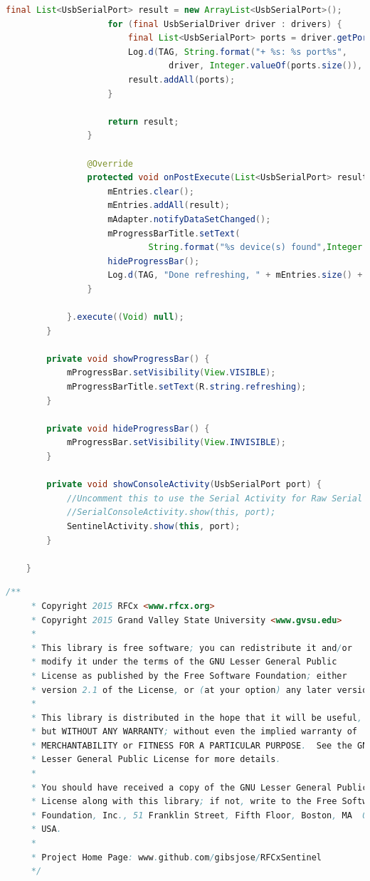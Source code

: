\documentclass{article}
\numberwithin{figure}{section}
\numberwithin{equation}{section}
\begin{document}
{\begin{lstlisting}[language=Java,label=lst:devicelist,caption=DeviceListActivity.java]
                    final List<UsbSerialPort> result = new ArrayList<UsbSerialPort>();
                    for (final UsbSerialDriver driver : drivers) {
                        final List<UsbSerialPort> ports = driver.getPorts();
                        Log.d(TAG, String.format("+ %s: %s port%s",
                                driver, Integer.valueOf(ports.size()), ports.size() == 1 ? "" : "s"));
                        result.addAll(ports);
                    }

                    return result;
                }

                @Override
                protected void onPostExecute(List<UsbSerialPort> result) {
                    mEntries.clear();
                    mEntries.addAll(result);
                    mAdapter.notifyDataSetChanged();
                    mProgressBarTitle.setText(
                            String.format("%s device(s) found",Integer.valueOf(mEntries.size())));
                    hideProgressBar();
                    Log.d(TAG, "Done refreshing, " + mEntries.size() + " entries found.");
                }

            }.execute((Void) null);
        }

        private void showProgressBar() {
            mProgressBar.setVisibility(View.VISIBLE);
            mProgressBarTitle.setText(R.string.refreshing);
        }

        private void hideProgressBar() {
            mProgressBar.setVisibility(View.INVISIBLE);
        }

        private void showConsoleActivity(UsbSerialPort port) {
            //Uncomment this to use the Serial Activity for Raw Serial Data
            //SerialConsoleActivity.show(this, port);
            SentinelActivity.show(this, port);
        }

    }
\end{lstlisting}

\begin{lstlisting}[language=Java,label=lst:sentlist,caption=SentinelActivity.java]
    /**
     * Copyright 2015 RFCx <www.rfcx.org>
     * Copyright 2015 Grand Valley State University <www.gvsu.edu>
     *
     * This library is free software; you can redistribute it and/or
     * modify it under the terms of the GNU Lesser General Public
     * License as published by the Free Software Foundation; either
     * version 2.1 of the License, or (at your option) any later version.
     *
     * This library is distributed in the hope that it will be useful,
     * but WITHOUT ANY WARRANTY; without even the implied warranty of
     * MERCHANTABILITY or FITNESS FOR A PARTICULAR PURPOSE.  See the GNU
     * Lesser General Public License for more details.
     *
     * You should have received a copy of the GNU Lesser General Public
     * License along with this library; if not, write to the Free Software
     * Foundation, Inc., 51 Franklin Street, Fifth Floor, Boston, MA  02110-1301,
     * USA.
     *
     * Project Home Page: www.github.com/gibsjose/RFCxSentinel
     */


\end{lstlisting}}
\end{document}
